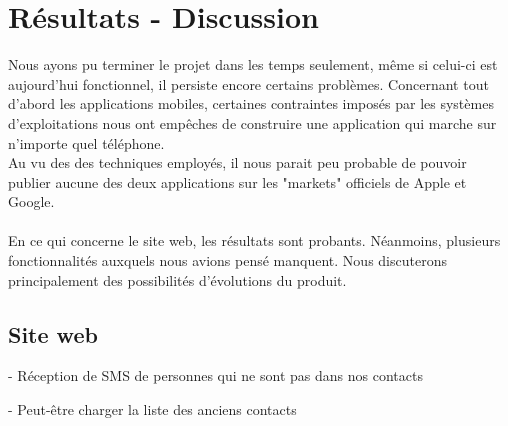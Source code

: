 \cleardoublepage



\chapter{Résultats - Discussion}

Nous ayons pu terminer le projet dans les temps seulement, même si celui-ci est aujourd'hui fonctionnel,
il persiste encore certains problèmes. Concernant tout d'abord les applications mobiles, certaines 
contraintes imposés par les systèmes d'exploitations nous ont empêches de construire une application 
qui marche sur n'importe quel téléphone.
\\
Au vu des des techniques employés, il nous parait peu probable de pouvoir publier aucune des
deux applications sur les "markets" officiels de Apple et Google.
\\\\

En ce qui concerne le site web, les résultats sont probants. Néanmoins, plusieurs fonctionnalités
auxquels nous avions pensé manquent. Nous discuterons principalement des possibilités d'évolutions du 
produit.


\section{Site web}

- Réception de SMS de personnes qui ne sont pas dans nos contacts

- Peut-être charger la liste des anciens contacts
\\






